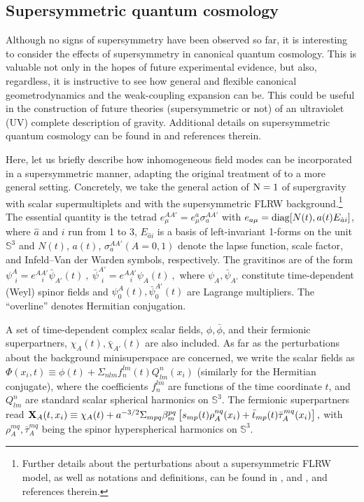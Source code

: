 \documentclass[12pt]{iopart}
\begin{document}
\subsection{\label{sec:sqc}Supersymmetric quantum cosmology}
Although no signs of supersymmetry have been observed so far, it is interesting to consider the effects of supersymmetry in canonical quantum cosmology. This is valuable not only in the hopes of future experimental evidence, but also, regardless, it is instructive to see how general and flexible canonical geometrodynamics and the weak-coupling expansion can be. This could be useful in the construction of future theories (supersymmetric or not) of an ultraviolet (UV) complete description of gravity. Additional details on supersymmetric quantum cosmology can be found in \citet{kiefer2005semiclassical,kiefer2006quantum,VargasMoniz:2010zz,VargasMoniz:2010zza} and references therein.

Here, let us 
briefly describe how  inhomogeneous field modes can be 
incorporated 
in a supersymmetric manner, adapting the original treatment of \citet{HalliwellHawking} to a more general setting. Concretely, we take the general 
action of  ${\rm N}=1$ of supergravity with
 scalar supermultiplets and with the supersymmetric FLRW background.\footnote{Further details about the perturbations about a supersymmetric FLRW model, as well as notations and definitions, can be found in \citet{Moniz:1998zz}, \citet{Moniz:1998zz} 
and \citet{kiefer2005semiclassical},  and references therein.} The essential quantity is the tetrad $e^{AA'}_\mu = e^a_\mu \sigma_a^{AA'}$ with 
$ 
e_{a\mu} = {\rm diag} [N(t), a (t) E_{\hat a i} ]$, 
where   $ \hat a $ and $ i $ run from 1 to 3, 
$ E_{\hat a i} $ is a basis of left-invariant 1-forms on the unit $ \mathbb{S}^3 $
and $N(t)$, $a(t)$, $\sigma_a^{AA'} (A = 0,1)$ denote 
the lapse function, scale factor, and Infeld--Van der Warden symbols, respectively. The gravitinos are of the form $
\psi^A_{~~i} = e^{AA'}_{~~~~i} \bar\psi_{A'} (t) ~, ~
\bar\psi^{A'}_{~~i} = e^{AA'}_{~~~~i} \psi_A (t) ~, 
$
where  
$\psi_A, \bar\psi_{A'}$ constitute  time-dependent (Weyl)  spinor fields and 
$\psi^A_0 (t), \bar \psi_0^{A'} (t)$ are Lagrange multipliers. The ``overline'' denotes Hermitian conjugation.
  
A  set of time-dependent  complex scalar fields, 
$\phi, \bar \phi$, and their 
fermionic superpartners, $\chi_A (t), \bar \chi_{A'} (t)$ are also included. As far as the perturbations about the background 
minisuperspace are concerned, 
we
write the scalar fields as 
$\Phi (x_i, t)  \equiv  \phi (t) + \Sigma_{nlm} f_{n}^{lm} (t) 
Q^{n}_{lm} (x_i)$ (similarly for the Hermitian conjugate), 
where 
the coefficients $f_{n}^{lm}$ are functions 
of the time coordinate $t$, and 
$Q^{n}_{lm}$ are standard scalar spherical harmonics on 
$\mathbb{S}^3$. The fermionic superpartners read 
$
{\bf X}_A (t, x_i)  \equiv  \chi_A (t) + a^{-3/2} \Sigma_{mpq} 
\beta_m^{pq} \left[ s_{mp} (t) \rho^{nq}_A (x_i) + 
\bar t_{mp} (t) \bar \tau_A^{mq} (x_i) \right],
$ with  $\rho^{mq}_A, 
 \bar \tau^{mq}_{A}$ being the 
spinor hyperspherical harmonics on $\mathbb{S}^3$. 
\end{document}
